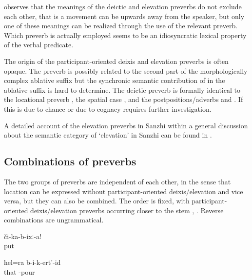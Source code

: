 \citet{Tatevosov2000} observes that the meanings of the deictic and elevation preverbs do not exclude each other, that is a movement can be upwards away from the speaker, but only one of these meanings can be realized through the use of the relevant preverb. Which preverb is actually employed seems to be an idiosyncratic lexical property of the verbal predicate.

The origin of the participant-oriented deixis and elevation preverbs is often opaque. The preverb  is possibly related to the second part of the morphologically complex ablative suffix  but the synchronic semantic contribution of  in the ablative suffix is hard to determine. The deictic preverb   is formally identical to the locational preverb  , the spatial case  , and the postpositions/adverbs   and  . If this is due to chance or due to cognacy requires further investigation.

A detailed account of the elevation preverbs in Sanzhi within a general discussion about the semantic category of `elevation' in Sanzhi can be found in \citet{ForkerLTSanzhi}.


\subsection{Combinations of preverbs}
\label{ssec:Combinations of preverbs}

The two groups of preverbs are independent of each other, in the sense that location can be expressed without participant-oriented deixis/elevation and vice versa, but they can also be combined. The order is fixed, with participant-oriented deixis/elevation preverbs occurring closer to the stem , . Reverse combinations are ungrammatical.
%
\begin{exe}
	\ex	\label{ex:Put (it) down verbs}
	\gll	či-ka-b-ixː-a!\\
		put\\
	\glt	{}

	\ex	\label{ex:I pour this in as well verbs}
	\gll	hel=ra	b-i-k-ert'-id\\
		that	-pour\\
	\glt	{}
\end{exe}

